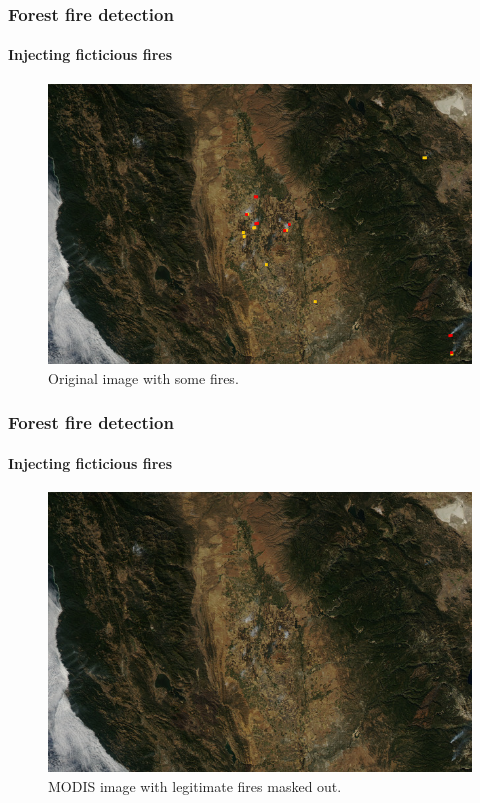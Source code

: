 \documentclass{beamer}
\begin{document}
\begin{frame}
  \frametitle{Forest fire detection}
  \framesubtitle{Injecting ficticious fires}

  \begin{figure}
    \includegraphics[width=\textwidth]{images/injection/original.jpg}
    \caption{Original image with some fires.}
    \label{fig:injection-orig}
  \end{figure}
\end{frame}

\begin{frame}
  \frametitle{Forest fire detection}
  \framesubtitle{Injecting ficticious fires}

  \begin{figure}
    \includegraphics[width=\textwidth]{images/injection/masked_0.jpg}
    \caption{MODIS image with legitimate fires masked out.}
    \label{fig:injection-masked}
  \end{figure}
\end{frame}
\end{document}
